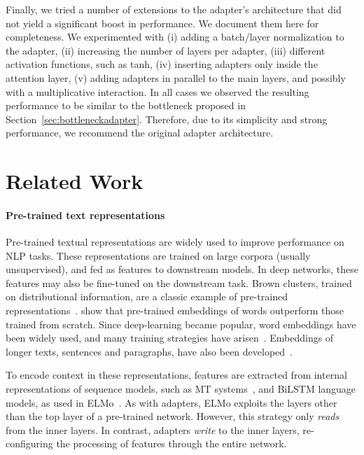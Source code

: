 Finally, we tried a number of extensions to the adapter's architecture that did not yield a significant boost in performance. We document them here for completeness. We experimented with (i) adding a batch/layer normalization to the adapter, (ii) increasing the number of layers per adapter, (iii) different activation functions, such as tanh, (iv) inserting adapters only inside the attention layer, (v) adding adapters in parallel to the main layers, and possibly with a multiplicative interaction. In all cases we observed the resulting performance to be similar to the bottleneck proposed in Section~\ref{sec:bottleneckadapter}.
Therefore, due to its simplicity and strong performance, we recommend the original adapter architecture.

\section{Related Work}

\paragraph{Pre-trained text representations} Pre-trained textual representations are widely used to improve performance on NLP tasks. These representations are trained on large corpora (usually unsupervised), and fed as features to downstream models. In deep networks, these features may also be fine-tuned on the downstream task. Brown clusters, trained on distributional information, are a classic example of pre-trained representations~\citep{brown1992}.
\citet{turian2010} show that pre-trained embeddings of words outperform those trained from scratch. Since deep-learning became popular, word embeddings have been widely used, and many training strategies have arisen~\citep{mikolov2013,pennington2014,bojanowski2017enriching}. Embeddings of longer texts, sentences and paragraphs, have also been developed~\citep{le2014,kiros2015,conneau2017,cer2019}.

To encode context in these representations, features are extracted from internal representations of sequence models, such as MT systems~\citep{mccann2017}, and BiLSTM language models, as used in ELMo~\citep{peters2018}. As with adapters, ELMo exploits the layers other than the top layer of a pre-trained network. However, this strategy only \emph{reads} from the inner layers. In contrast, adapters \emph{write} to the inner layers, re-configuring the processing of features through the entire network.

